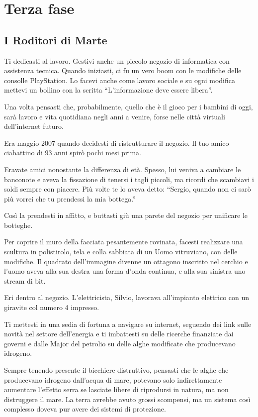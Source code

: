 \chapter{Terza fase}
\label{terza_fase} %

\section{I Roditori di Marte}
\label{rodotori_di_marte}

Ti dedicasti al lavoro. Gestivi anche un piccolo negozio di informatica con assistenza tecnica. Quando iniziasti, ci fu un vero boom con le modifiche delle consolle PlayStation. Lo facevi anche come lavoro sociale e su ogni modifica mettevi un bollino con la scritta “L'informazione deve essere libera”.

Una volta pensasti che, probabilmente, quello che è il gioco per i bambini di oggi, sarà lavoro e vita quotidiana negli anni a venire, forse nelle città virtuali dell'internet futuro.

Era maggio 2007 quando decidesti di ristrutturare il negozio. Il tuo amico ciabattino di 93 anni spirò pochi mesi prima.

Eravate amici nonostante la differenza di età. Spesso, lui veniva a cambiare le banconote e aveva la fissazione di tenersi i tagli piccoli, ma ricordi che scambiavi i soldi sempre con piacere. Più volte te lo aveva detto: “Sergio, quando non ci sarò più vorrei che tu prendessi la mia bottega.”

Così la prendesti in affitto, e buttasti giù una parete del negozio per unificare le botteghe.

Per coprire il muro della facciata pesantemente rovinata, facesti realizzare una scultura in polistirolo, tela e colla sabbiata di un Uomo vitruviano, con delle modifiche. Il quadrato dell'immagine divenne un ottagono inscritto nel cerchio e l'uomo aveva alla sua destra una forma d'onda continua, e alla sua sinistra uno stream di bit.

Eri dentro al negozio. L'elettricista, Silvio, lavorava all'impianto elettrico con un giravite col numero 4 impresso.

Ti mettesti in una sedia di fortuna a navigare su internet, seguendo dei link sulle novità nel settore dell'energia e ti imbattesti su delle ricerche finanziate dai governi e dalle Major del petrolio su delle alghe modificate che producevano idrogeno.

Sempre tenendo presente il bicchiere distruttivo, pensasti che le alghe che producevano idrogeno dall'acqua di mare, potevano solo indirettamente aumentare l'effetto serra se lasciate libere di riprodursi in natura, ma non distruggere il mare. La terra avrebbe avuto grossi scompensi, ma un sistema così complesso doveva pur avere dei sistemi di protezione.

